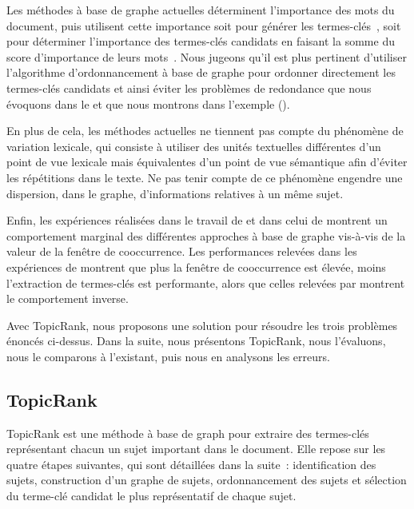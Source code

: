     Les méthodes à base de graphe actuelles déterminent l'importance des mots du
    document, puis utilisent cette importance soit pour générer les
    termes-clés~\cite{mihalcea2004textrank}, soit pour déterminer l'importance
    des termes-clés candidats en faisant la somme du score d'importance de leurs
    mots~\cite{wan2008expandrank}. Nous jugeons qu'il est plus pertinent
    d'utiliser l'algorithme d'ordonnancement à base de graphe pour ordonner
    directement les termes-clés candidats et ainsi éviter les problèmes de
    redondance que nous évoquons dans le
     et que nous montrons dans
    l'exemple 
    ().
    
    En plus de cela, les méthodes actuelles ne tiennent pas compte du phénomène
    de variation lexicale, qui consiste à utiliser des unités textuelles
    différentes d'un point de vue lexicale mais équivalentes d'un point de vue
    sémantique afin d'éviter les répétitions dans le texte. Ne pas tenir compte
    de ce phénomène engendre une dispersion, dans le graphe, d'informations
    relatives à un même sujet.
    
    Enfin, les expériences réalisées dans le travail de
     et dans celui de 
    montrent un comportement marginal des différentes approches à base de graphe
    vis-à-vis de la valeur de la fenêtre de cooccurrence. Les performances
    relevées dans les expériences de  montrent que
    plus la fenêtre de cooccurrence est élevée, moins l'extraction de
    termes-clés est performante, alors que celles relevées par
     montrent le comportement inverse. 

    Avec TopicRank, nous proposons une solution pour résoudre les trois
    problèmes énoncés ci-dessus. Dans la suite, nous présentons TopicRank, nous
    l'évaluons, nous le comparons à l'existant, puis nous en analysons les
    erreurs.

    \subsection{TopicRank}
    \label{subsec:main-automatic_keyphrase_annotation-unsupervised_automatic_keyphrase_extraction-topicrank}
      TopicRank est une méthode à base de graph pour extraire des termes-clés
      représentant chacun un sujet important dans le document.
      Elle repose sur les quatre étapes suivantes, qui sont détaillées dans
      la suite~: identification des sujets, construction d'un graphe de sujets,
      ordonnancement des sujets et sélection du terme-clé candidat le plus
      représentatif de chaque sujet.

